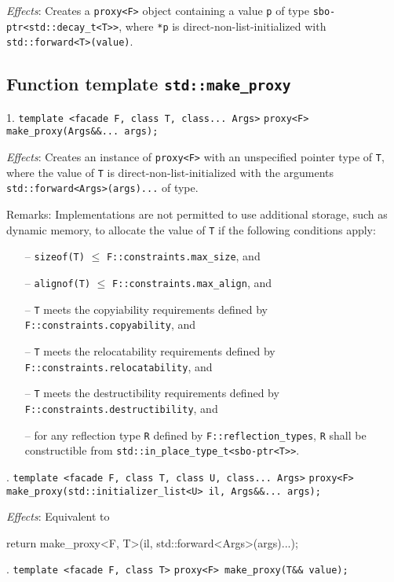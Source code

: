\documentclass[10pt, a4paper, oneside]{article}
\begin{document}
\textit{Effects}: Creates a \verb|proxy<F>| object containing a value \verb|p| of type \verb|sbo-ptr<std::decay_t<T>>|,
where \verb|*p| is direct\hyp{}non\hyp{}list\hyp{}initialized with \verb|std::forward<T>(value)|.

\subsection{Function template \texttt{std::make\_proxy}}
1. \verb|template <facade F, class T, class... Args>|\smallbreak
\indent \verb|proxy<F> make_proxy(Args&&... args);|

\textit{Effects}: Creates an instance of \verb|proxy<F>| with an unspecified pointer type of \verb|T|,
where the value of \verb|T| is direct-non-list-initialized with the arguments \verb|std::forward<Args>(args)...| of type.

Remarks: Implementations are not permitted to use additional storage, such as dynamic memory, to
allocate the value of \verb|T| if the following conditions apply:
\begin{itemize}
  \item[--] \verb|sizeof(T)| $\le$ \verb|F::constraints.max_size|, and
  \item[--] \verb|alignof(T)| $\le$ \verb|F::constraints.max_align|, and
  \item[--] \verb|T| meets the copyiability requirements defined by \verb|F::constraints.copyability|, and
  \item[--] \verb|T| meets the relocatability requirements defined by \verb|F::constraints.relocatability|, and
  \item[--] \verb|T| meets the destructibility requirements defined by \verb|F::constraints.destructibility|, and
  \item[--] for any reflection type \verb|R| defined by \verb|F::reflection_types|,\smallbreak
  \verb|R| shall be constructible from \verb|std::in_place_type_t<sbo-ptr<T>>|.
\end{itemize}

. \verb|template <facade F, class T, class U, class... Args>|\smallbreak
\indent \verb|proxy<F> make_proxy(std::initializer_list<U> il, Args&&... args);|

\textit{Effects}: Equivalent to
\begin{codeblock}
  return make_proxy<F, T>(il, std::forward<Args>(args)...);
\end{codeblock}

. \verb|template <facade F, class T>|\smallbreak
\indent \verb|proxy<F> make_proxy(T&& value);|
\end{document}
